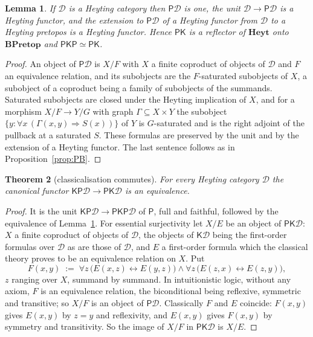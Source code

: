 \documentclass[11pt]{amsart}
\newtheorem{thm}{Theorem}[section]
\newtheorem{lem}[thm]{Lemma}
\theoremstyle{definition}
\newcommand{\BPretop}{\mathbf{BPretop}}
\newcommand{\PP}{\mathsf P}
\newcommand{\cD}{\mathcal D}
\begin{document}
\begin{lem}\label{lem:PHeyt}
If $\cD$ is a Heyting category then $\PP\cD$ is one, the unit
$\cD\to\PP\cD$ is a Heyting functor, and the extension to $\PP\cD$ of a
Heyting functor from $\cD$ to a Heyting pretopos is a Heyting functor.
Hence $\PP\mathsf K$ is a reflector of $\mathbf{Heyt}$ onto $\BPretop$
and $\PP\mathsf K\PP\simeq\PP\mathsf K$.
\end{lem}
\begin{proof}
An object of $\PP\cD$ is $X/F$ with $X$ a finite coproduct of objects of
$\cD$ and $F$ an equivalence relation, and its subobjects are the
$F$-saturated subobjects of $X$, a subobject of a coproduct being a
family of subobjects of the summands. Saturated subobjects are closed
under the Heyting implication of $X$, and for a morphism $X/F\to Y/G$
with graph $\Gamma\subseteq X\times Y$ the subobject $\{y:\forall
x\,(\Gamma(x,y)\Rightarrow S(x))\}$ of $Y$ is $G$-saturated and is the
right adjoint of the pullback at a saturated $S$. These formulas are
preserved by the unit and by the extension of a Heyting functor. The
last sentence follows as in Proposition~\ref{prop:PB}.
\end{proof}

\begin{thm}[classicalisation commutes]\label{thm:K}
For every Heyting category $\cD$ the canonical functor
$\mathsf K\PP\cD\to\PP\mathsf K\cD$ is an equivalence.
\end{thm}
\begin{proof}
It is the unit $\mathsf K\PP\cD\to\PP\mathsf K\PP\cD$ of $\PP$, full and
faithful, followed by the equivalence of Lemma~\ref{lem:PHeyt}. For
essential surjectivity let $X/E$ be an object of $\PP\mathsf K\cD$: $X$ a
finite coproduct of objects of $\cD$, the objects of $\mathsf K\cD$
being the first-order formulas over $\cD$ as are those of $\cD$, and $E$
a first-order formula which the classical theory proves to be an
equivalence relation on $X$. Put
\[
F(x,y)\;:=\;\forall z\,\big(E(x,z)\leftrightarrow E(y,z)\big)\wedge
\forall z\,\big(E(z,x)\leftrightarrow E(z,y)\big),
\]
$z$ ranging over $X$, summand by summand. In intuitionistic logic,
without any axiom, $F$ is an equivalence relation, the biconditional
being reflexive, symmetric and transitive; so $X/F$ is an object of
$\PP\cD$. Classically $F$ and $E$ coincide: $F(x,y)$ gives $E(x,y)$ by
$z=y$ and reflexivity, and $E(x,y)$ gives $F(x,y)$ by symmetry and
transitivity. So the image of $X/F$ in $\PP\mathsf K\cD$ is $X/E$.
\end{proof}
\end{document}
